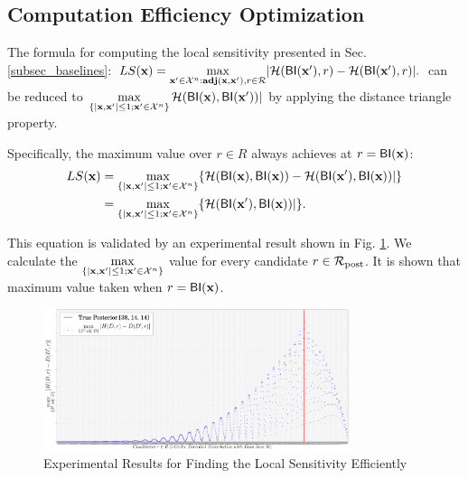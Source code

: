 \documentclass{article}
\begin{document}
\subsection{Computation Efficiency Optimization}
\label{subsec_effi}
The formula for computing the local sensitivity presented in Sec. \ref{subsec_baselines}: $LS(\textbf{x})=\max\limits_{\textbf{x}' \in \mathcal{X}^n:\textbf{adj}(\textbf{x},\textbf{x}'), r\in \mathcal{R}}\lvert \mathcal{H}(\mathsf{BI}(\textbf{x}'), r) - \mathcal{H}(\mathsf{BI}(\textbf{x}'), r)\rvert.$ 
can be reduced to $\max\limits_{\{|\textbf{x},\textbf{x}'| \leq 1; \textbf{x}'\in \mathcal{X}^n\}}\mathcal{H}(\mathsf{BI}(\textbf{x}), \mathsf{BI}(\textbf{x}'))|$
by applying the distance triangle property. 

Specifically, the maximum value over ${r \in R}$ always achieves at $r = \mathsf{BI}(\textbf{x})$:
\begin{equation*}
\begin{split}
LS(\textbf{x}) 
  & = \max\limits_{\{|\textbf{x},\textbf{x}'| \leq 1;\textbf{x}'\in \mathcal{X}^n\}} \{\mathcal{H}(\mathsf{BI}(\textbf{x}), \mathsf{BI}(\textbf{x})) - \mathcal{H}(\mathsf{BI}(\textbf{x}'), \mathsf{BI}(\textbf{x}))|\} \\
  & = \max\limits_{\{|\textbf{x},\textbf{x}'| \leq 1;\textbf{x}'\in \mathcal{X}^n\}} \{\mathcal{H}(\mathsf{BI}(\textbf{x}'), \mathsf{BI}(\textbf{x}))|\}.
\end{split}
\end{equation*}

This equation is validated by an experimental result shown in Fig. \ref{fig_efficiency}. We calculate the $\max\limits_{\{|\textbf{x},\textbf{x}'| \leq 1;\textbf{x}'\in \mathcal{X}^n\}}$ value for every candidate $r \in \mathcal{R}_{\textup{post}}$. It is shown that maximum value taken when  $r = \mathsf{BI}(\textbf{x})$.

\begin{figure}[ht]
\centering
\includegraphics[width=0.8\textwidth]{efficiency}
\caption{Experimental Results for Finding the Local Sensitivity Efficiently}
\label{fig_efficiency}
\end{figure}
\end{document}
